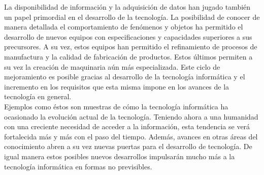 \documentclass[a4paper,12pt]{article}
\begin{document}
La disponibilidad de información y la adquisición de datos han jugado también un papel primordial en el desarrollo de la tecnología.
La posibilidad de conocer de manera detallada el comportamiento de fenómenos y objetos ha permitido el desarrollo de nuevos equipos con especificaciones y capacidades superiores a sus precursores.
A su vez, estos equipos han permitido el refinamiento de procesos de manufactura y la calidad de fabricación de productos.
Estos últimos permiten a su vez la creación de maquinaria aún más especializada.
Este ciclo de mejoramiento es posible gracias al desarrollo de la tecnología informática y el incremento en los requisitos que esta misma impone en los avances de la tecnología en general.\\

Ejemplos como éstos son muestras de cómo la tecnología informática ha ocasionado la evolución actual de la tecnología.
Teniendo ahora a una humanidad con una creciente necesidad de acceder a la información, esta tendencia se verá fortalecida más y más con el paso del tiempo.
Además, avances en otras áreas del conocimiento abren a su vez nuevas puertas para el desarrollo de tecnología.
De igual manera estos posibles nuevos desarrollos impulsarán mucho más a la tecnología informática en formas no previsibles.


\end{document}
